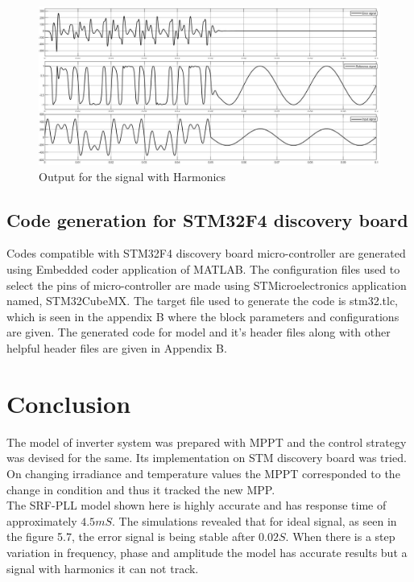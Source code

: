 \documentclass[a4paper,12pt]{iitmdiss}
\begin{document}
\begin{figure}[hbt!]
    \centering
    \includegraphics[width=1.0\textwidth]{Harmonics_Outpu.jpg}
    \caption{Output for the signal with Harmonics}
\end{figure}




\section{Code generation for STM32F4 discovery board}
Codes compatible with STM32F4 discovery board micro-controller are generated using Embedded coder application of MATLAB. The configuration files used to select the pins of micro-controller are made using STMicroelectronics application named, STM32CubeMX. The target file used to generate the code is stm32.tlc, which is seen in the appendix B where the block parameters and configurations are given.
The generated code for model and it's header files along with other helpful header files are given in Appendix B.

\chapter{Conclusion}

The model of inverter system was prepared with MPPT and the control strategy was devised for the same. Its implementation on STM discovery board was tried. On changing irradiance and temperature values the MPPT corresponded to the change in condition and thus it tracked the new MPP.
\\The SRF-PLL model shown here is highly accurate and has response time of approximately $4.5mS$. The simulations revealed that for ideal signal, as seen in the figure 5.7, the error signal is being stable after $0.02S$. When there is a step variation in frequency, phase and amplitude the model has accurate results but a signal with harmonics it can not track.
\end{document}
